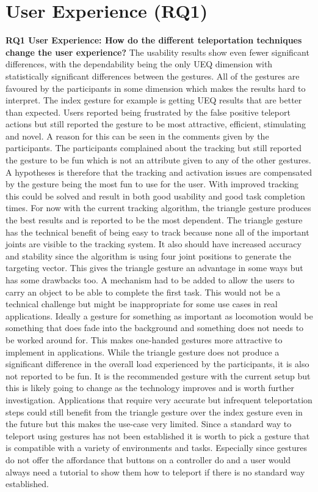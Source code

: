\section{User Experience (RQ1)}
\textbf{RQ1 User Experience: How do the different teleportation techniques change the user experience?}
The usability results show even fewer significant differences, with the dependability being the only UEQ dimension with statistically significant differences between the gestures. All of the gestures are favoured by the participants in some dimension which makes the results hard to interpret. The index gesture for example is getting UEQ results that are better than expected. Users reported being frustrated by the false positive teleport actions but still reported the gesture to be most attractive, efficient, stimulating and novel. A reason for this can be seen in the comments given by the participants. The participants complained about the tracking but still reported the gesture to be fun which is not an attribute given to any of the other gestures. A hypotheses is therefore that the tracking and activation issues are compensated by the gesture being the most fun to use for the user. With improved tracking this could be solved and result in both good usability and good task completion times. For now with the current tracking algorithm, the triangle gesture produces the best results and is reported to be the most dependent. The triangle gesture has the technical benefit of being easy to track because none all of the important joints are visible to the tracking system. It also should have increased accuracy and stability since the algorithm is using four joint positions to generate the targeting vector. This gives the triangle gesture an advantage in some ways but has some drawbacks too. A mechanism had to be added to allow the users to carry an object to be able to complete the first task. This would not be a technical challenge but might be inappropriate for some use cases in real applications. Ideally a gesture for something as important as locomotion would be something that does fade into the background and something does not needs to be worked around for. This makes one-handed gestures more attractive to implement in applications. While the triangle gesture does not produce a significant difference in the overall load experienced by the participants, it is also not reported to be fun. It is the recommended gesture with the current setup but this is likely going to change as the technology improves and is worth further investigation. Applications that require very accurate but infrequent teleportation steps could still benefit from the triangle gesture over the index gesture even in the future but this makes the use-case very limited. Since a standard way to teleport using gestures has not been established it is worth to pick a gesture that is compatible with a variety of environments and tasks. Especially since gestures do not offer the affordance that buttons on a controller do and a user would always need a tutorial to show them how to teleport if there is no standard way established. 



